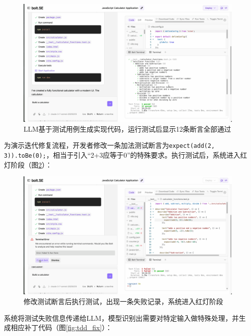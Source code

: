 \begin{figure}[H]
  \centering
  \includegraphics[width=.9\textwidth]{figures/screenshots/tdd/green_pass_initial.png}
  \caption{LLM基于测试用例生成实现代码，运行测试后显示12条断言全部通过}
  \label{fig:tdd_green_initial}
\end{figure}

为演示迭代修复流程，开发者修改一条加法测试断言为\verb|expect(add(2, 3)).toBe(0);|，相当于引入“2+3应等于0”的特殊要求。执行测试后，系统进入红灯阶段（图\ref{fig:tdd_red}）：

\begin{figure}[H]
  \centering
  \includegraphics[width=.9\textwidth]{figures/screenshots/tdd/test_edit_fail.png}
  \caption{修改测试断言后执行测试，出现一条失败记录，系统进入红灯阶段}
  \label{fig:tdd_red}
\end{figure}

系统将测试失败信息传递给LLM，模型识别出需要对特定输入做特殊处理，并生成相应补丁代码（图\ref{fig:tdd_fix}）：

